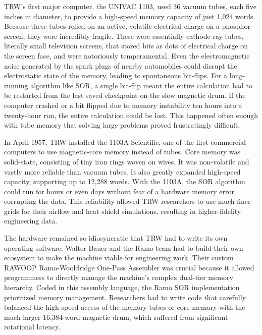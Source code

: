 TRW’s first major computer, the UNIVAC 1103, used 36 vacuum tubes, each five inches in diameter, to provide a high-speed memory capacity of just 1,024 words. Because these tubes relied on an active, volatile electrical charge on a phosphor screen, they were incredibly fragile.  These were essentially cathode ray tubes, literally small television screens, that stored bits as dots of electrical charge on the screen face, and were notoriously temperamental. Even the electromagnetic noise generated by the spark plugs of nearby automobiles could disrupt the electrostatic state of the memory, leading to spontaneous bit-flips. For a long-running algorithm like SOR, a single bit-flip meant the entire calculation had to be restarted from the last saved checkpoint on the slow magnetic drum. If the computer crashed or a bit flipped due to memory instability ten hours into a twenty-hour run, the entire calculation could be lost. This happened often enough with tube memory that solving large problems proved frustratingly difficult. 

In April 1957, TRW installed the 1103A Scientific, one of the first commercial computers to use magnetic-core memory instead of tubes. Core memory was solid-state, consisting of tiny iron rings woven on wires. It was non-volatile and vastly more reliable than vacuum tubes. It also greatly expanded high-speed capacity, supporting up to 12,288 words. With the 1103A, the SOR algorithm could run for hours or even days without fear of a hardware memory error corrupting the data. This reliability allowed TRW researchers to use much finer grids for their airflow and heat shield simulations, resulting in higher-fidelity engineering data. 

The hardware remained so idiosyncratic that TRW had to write its own operating software. Walter Bauer and the Ramo team had to build their own ecosystem to make the machine viable for engineering work. Their custom RAWOOP Ramo-Wooldridge One-Pass Assembler was crucial because it allowed programmers to directly manage the machine's complex dual-tier memory hierarchy. Coded in this assembly language, the Ramo SOR implementation prioritized memory management. Researchers had to write code that carefully balanced the high-speed access of the memory tubes or core memory with the much larger 16,384-word magnetic drum, which suffered from significant rotational latency. 

